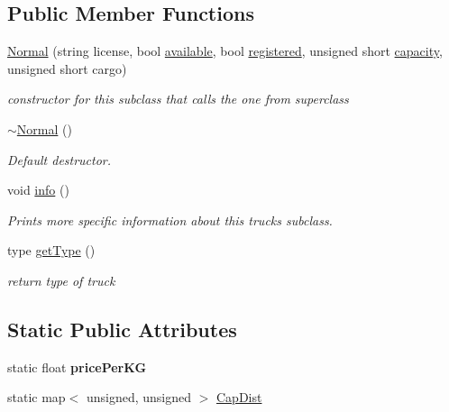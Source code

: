 \subsection*{Public Member Functions}
\begin{DoxyCompactItemize}
\item 
\hyperlink{class_normal_a5bfcd1d763c6cf56bdcf4de370903da7}{Normal} (string license, bool \hyperlink{class_truck_a4189fe5ed32f6084459a9c5ae1eb7c2a}{available}, bool \hyperlink{class_truck_a80b8405cf7a15b236fef70116f99c4fb}{registered}, unsigned short \hyperlink{class_truck_ab004524786ae7aebf7c7bdb5e1599696}{capacity}, unsigned short cargo)
\begin{DoxyCompactList}\small\item\em constructor for this subclass that calls the one from superclass \end{DoxyCompactList}\item 
\hyperlink{class_normal_a2ed547e3b7361c3675224d352cf79740}{$\sim$\+Normal} ()
\begin{DoxyCompactList}\small\item\em Default destructor. \end{DoxyCompactList}\item 
void \hyperlink{class_normal_ade6add2ee09e701113534c97e2a03307}{info} ()
\begin{DoxyCompactList}\small\item\em Prints more specific information about this truck\textquotesingle{}s subclass. \end{DoxyCompactList}\item 
type \hyperlink{class_normal_ae34be8332ea67df5fb0ae9b274884748}{get\+Type} ()
\begin{DoxyCompactList}\small\item\em return type of truck \end{DoxyCompactList}\end{DoxyCompactItemize}
\subsection*{Static Public Attributes}
\begin{DoxyCompactItemize}
\item 
\mbox{\label{class_normal_a8aae6212077e4f0c359d7fcfb5af3743}} 
static float {\bfseries price\+Per\+KG}
\item 
static map$<$ unsigned, unsigned $>$ \hyperlink{class_normal_a1ccae0db66db16a387c05009bf7194f8}{Cap\+Dist}
\end{DoxyCompactItemize}
